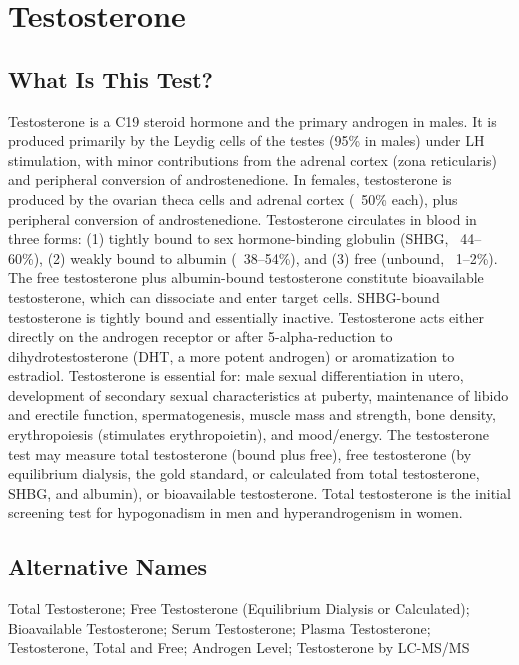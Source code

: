 \chapter{Testosterone}

\section*{What Is This Test?}
Testosterone is a C19 steroid hormone and the primary androgen in males. It is produced primarily by the Leydig cells of the testes (95\% in males) under LH stimulation, with minor contributions from the adrenal cortex (zona reticularis) and peripheral conversion of androstenedione. In females, testosterone is produced by the ovarian theca cells and adrenal cortex (~50\% each), plus peripheral conversion of androstenedione. Testosterone circulates in blood in three forms: (1) tightly bound to sex hormone-binding globulin (SHBG, ~44--60\%), (2) weakly bound to albumin (~38--54\%), and (3) free (unbound, ~1--2\%). The free testosterone plus albumin-bound testosterone constitute bioavailable testosterone, which can dissociate and enter target cells. SHBG-bound testosterone is tightly bound and essentially inactive. Testosterone acts either directly on the androgen receptor or after 5-alpha-reduction to dihydrotestosterone (DHT, a more potent androgen) or aromatization to estradiol. Testosterone is essential for: male sexual differentiation in utero, development of secondary sexual characteristics at puberty, maintenance of libido and erectile function, spermatogenesis, muscle mass and strength, bone density, erythropoiesis (stimulates erythropoietin), and mood/energy. The testosterone test may measure total testosterone (bound plus free), free testosterone (by equilibrium dialysis, the gold standard, or calculated from total testosterone, SHBG, and albumin), or bioavailable testosterone. Total testosterone is the initial screening test for hypogonadism in men and hyperandrogenism in women.

\section*{Alternative Names}
Total Testosterone; Free Testosterone (Equilibrium Dialysis or Calculated); Bioavailable Testosterone; Serum Testosterone; Plasma Testosterone; Testosterone, Total and Free; Androgen Level; Testosterone by LC-MS/MS

